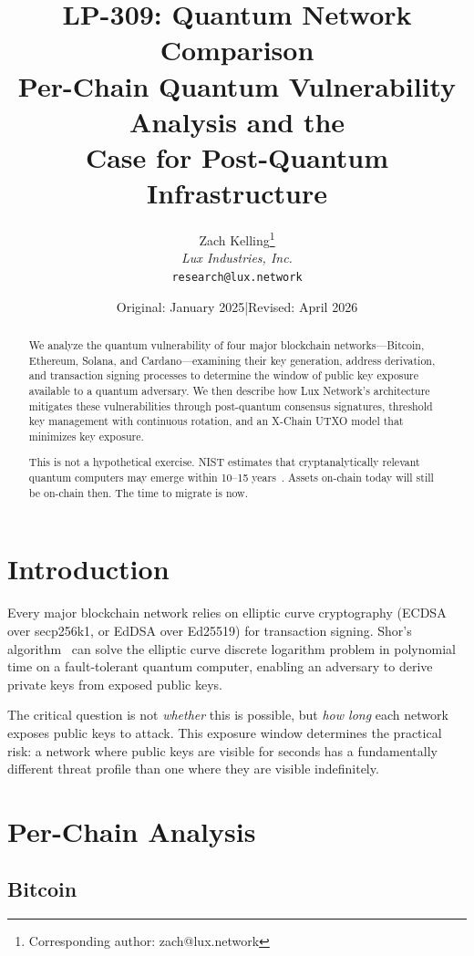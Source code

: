 \documentclass[11pt,a4paper]{article}
\title{LP-309: Quantum Network Comparison\\[4pt]
\large Per-Chain Quantum Vulnerability Analysis and the\\
Case for Post-Quantum Infrastructure}
\author{
Zach Kelling\thanks{Corresponding author: zach@lux.network}\\
\textit{Lux Industries, Inc.}\\
\texttt{research@lux.network}
}
\date{Original: January 2025\quad|\quad Revised: April 2026}
\begin{document}
\luxcoverpage

\begin{abstract}
We analyze the quantum vulnerability of four major blockchain
networks---Bitcoin, Ethereum, Solana, and Cardano---examining their
key generation, address derivation, and transaction signing processes
to determine the window of public key exposure available to a quantum
adversary. We then describe how Lux Network's architecture mitigates
these vulnerabilities through post-quantum consensus signatures,
threshold key management with continuous rotation, and an X-Chain UTXO
model that minimizes key exposure.

This is not a hypothetical exercise. NIST estimates that
cryptanalytically relevant quantum computers may emerge within 10--15
years~\cite{nist-pqc-report}. Assets on-chain today will still be
on-chain then. The time to migrate is now.
\end{abstract}

\tableofcontents
\newpage

\section{Introduction}

Every major blockchain network relies on elliptic curve cryptography
(ECDSA over secp256k1, or EdDSA over Ed25519) for transaction signing.
Shor's algorithm~\cite{shor1999} can solve the elliptic curve discrete
logarithm problem in polynomial time on a fault-tolerant quantum
computer, enabling an adversary to derive private keys from exposed
public keys.

The critical question is not \emph{whether} this is possible, but
\emph{how long} each network exposes public keys to attack. This
exposure window determines the practical risk: a network where public
keys are visible for seconds has a fundamentally different threat
profile than one where they are visible indefinitely.

\section{Per-Chain Analysis}

\subsection{Bitcoin}
\end{document}
